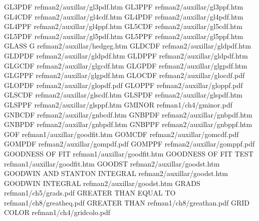 GL3PDF                                  refman2/auxillar/gl3pdf.htm
GL3PPF                                  refman2/auxillar/gl3ppf.htm
GL4CDF                                  refman2/auxillar/gl4cdf.htm
GL4PDF                                  refman2/auxillar/gl4pdf.htm
GL4PPF                                  refman2/auxillar/gl4ppf.htm
GL5CDF                                  refman2/auxillar/gl5cdf.htm
GL5PDF                                  refman2/auxillar/gl5pdf.htm
GL5PPF                                  refman2/auxillar/gl5ppf.htm
GLASS G                                 refman2/auxillar/hedgeg.htm
GLDCDF                                  refman2/auxillar/gldpdf.htm
GLDPDF                                  refman2/auxillar/gldpdf.htm
GLDPPF                                  refman2/auxillar/gldpdf.htm
GLGCDF                                  refman2/auxillar/glgcdf.htm
GLGPDF                                  refman2/auxillar/glgpdf.htm
GLGPPF                                  refman2/auxillar/glgpdf.htm
GLOCDF                                  refman2/auxillar/glocdf.pdf
GLOPDF                                  refman2/auxillar/glopdf.pdf
GLOPPF                                  refman2/auxillar/gloppf.pdf
GLSCDF                                  refman2/auxillar/glscdf.htm
GLSPDF                                  refman2/auxillar/glspdf.htm
GLSPPF                                  refman2/auxillar/glsppf.htm
GMINOR                                  refman1/ch4/gminor.pdf
GNBCDF                                  refman2/auxillar/gnbcdf.htm
GNBPDF                                  refman2/auxillar/gnbpdf.htm
GNBPDF                                  refman2/auxillar/gnbpdf.htm
GNBPPF                                  refman2/auxillar/gnbppf.htm
GOF                                     refman1/auxillar/goodfit.htm
GOMCDF                                  refman2/auxillar/gomcdf.pdf
GOMPDF                                  refman2/auxillar/gompdf.pdf
GOMPPF                                  refman2/auxillar/gomppf.pdf
GOODNESS OF FIT                         refman1/auxillar/goodfit.htm
GOODNESS OF FIT TEST                    refman1/auxillar/goodfit.htm
GOODST                                  refman2/auxillar/goodst.htm
GOODWIN AND STANTON INTEGRAL            refman2/auxillar/goodst.htm
GOODWIN INTEGRAL                        refman2/auxillar/goodst.htm
GRADS                                   refman1/ch5/grads.pdf
GREATER THAN EQUAL TO                   refman1/ch8/greatheq.pdf
GREATER THAN                            refman1/ch8/greathan.pdf
GRID COLOR                              refman1/ch4/gridcolo.pdf
